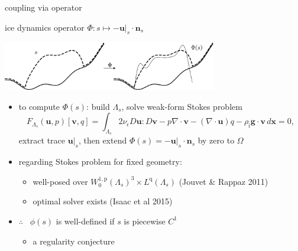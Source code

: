 \documentclass[usepdftitle=false]{beamer}
\newcommand{\eps}{\epsilon}
\newcommand{\Div}{\nabla\cdot}
\newcommand{\bg}{\mathbf{g}}
\newcommand{\bn}{\mathbf{n}}
\newcommand{\bu}{\mathbf{u}}
\newcommand{\bv}{\mathbf{v}}
\newcommand{\bx}{\mathbf{x}}
\newcommand{\rhoi}{\rho_{\text{i}}}
\newcommand{\pp}{{\text{p}}}
\newcommand{\qq}{{\text{q}}}
\newcommand{\bus}{\bu|_s}
\begin{document}
\begin{frame}{coupling via operator}

\begin{block}{ice dynamics operator}
$\Phi : s \mapsto - \bus \cdot \bn_s$

\vspace{-3mm}

\hfill \includegraphics[width=0.7\textwidth]{figs/idoaction.png}
\end{block}

\begin{itemize}
\item to compute $\Phi(s)$: build $\Lambda_s$, solve weak-form Stokes problem
    $$F_{\Lambda_s}(\bu,p)[\bv,q] = \int_{\Lambda_s} 2 \nu_\eps D\bu : D\bv - p \Div\bv - (\Div\bu) q - \rhoi \bg \cdot \bv\,d\bx = 0,$$
extract trace $\bus$, then extend $\Phi(s) = -\bus \cdot \bn_s$ by zero to $\Omega$
\item regarding Stokes problem for fixed geometry:
    \begin{itemize}
    \item well-posed over $W_0^{1,\pp}(\Lambda_s)^3 \times L^\qq(\Lambda_s)$ (Jouvet \& Rappaz 2011)
    \item optimal solver exists (Isaac et al 2015)
    \end{itemize}
\item $\therefore$ \, $\phi(s)$ is well-defined if $s$ is piecewise $C^1$
    \begin{itemize}
    \item a regularity conjecture
    \end{itemize}
\end{itemize}

\end{frame}
\end{document}
